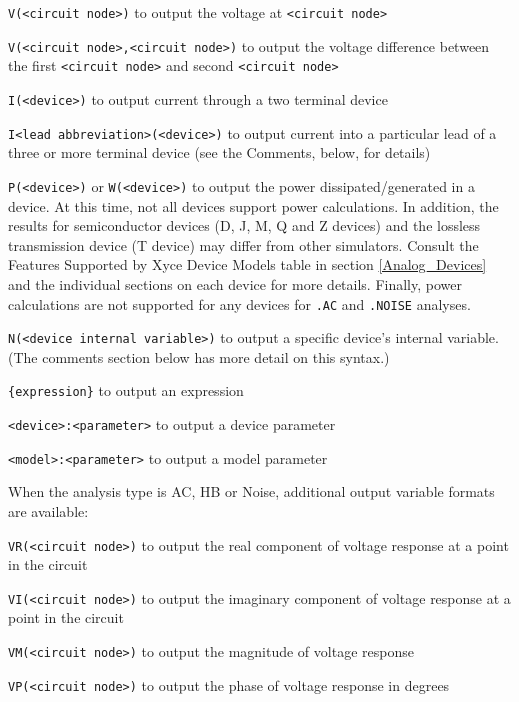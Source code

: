 \begin{Command}
\begin{Arguments}
\begin{XyceItemize}
\item \texttt{V(<circuit node>)} to output the voltage at \texttt{<circuit node>}
\item \texttt{V(<circuit node>,<circuit node>)} to output the voltage difference between the first \texttt{<circuit node>} and second \texttt{<circuit node>}
\item \texttt{I(<device>)} to output current through a two terminal device
\item \texttt{I<lead abbreviation>(<device>)} to output current into a particular lead of a three or more terminal device (see the Comments, below, for details) 
\item \texttt{P(<device>)} or \texttt{W(<device>)} to output the power dissipated/generated in a device. 
At this time, not all devices support power calculations. In addition, the results for semiconductor devices
(D, J, M, Q and Z devices) and the lossless transmission device (T device) may differ from other simulators.  
Consult the Features Supported by Xyce Device Models table
in section \ref{Analog_Devices} and the individual sections on each device for more details.  Finally,
power calculations are not supported for any devices for \texttt{.AC} and \texttt{.NOISE} analyses.
\item \texttt{N(<device internal variable>)} to output a specific device's internal variable. (The comments section
below has more detail on this syntax.)
\item \texttt{\{expression\}} to output an expression
\item \texttt{<device>:<parameter>} to output a device parameter
\item \texttt{<model>:<parameter>} to output a model parameter
\end{XyceItemize}
When the analysis type is AC, HB or Noise, additional output variable formats are available:
\begin{XyceItemize}
\item \texttt{VR(<circuit node>)} to output the real component of voltage response at a point in the circuit
\item \texttt{VI(<circuit node>)} to output the imaginary component of voltage response at a point in the circuit
\item \texttt{VM(<circuit node>)} to output the magnitude of voltage response
\item \texttt{VP(<circuit node>)} to output the phase of voltage response in degrees

\end{XyceItemize}
\end{Arguments}
\end{Command}
